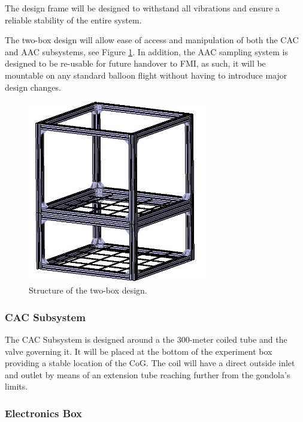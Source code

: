 The design frame will be designed to withstand all vibrations and ensure a reliable stability of the entire system. 

The two-box design will allow ease of access and manipulation of both the CAC and AAC subsystems, see Figure \ref{strucutre}. In addition, the AAC sampling system is designed to be re-usable for future handover to FMI, as such, it will be mountable on any standard balloon flight without having to introduce major design changes.

\begin{figure}[!ht]
    \centering
    \includegraphics[width=0.7\textwidth]{4-experiment-design/img/frame_structure.jpg}
    \caption{Structure of the two-box design.}
    \label{strucutre}
\end{figure}

\subsubsection{CAC Subsystem}

The CAC Subsystem is designed around a the 300-meter coiled tube and the valve governing it. It will be placed at the bottom of the experiment box providing a stable location of the CoG. The coil will have a direct outside inlet and outlet by means of an extension tube reaching further from the gondola’s limits.

\pagebreak
\subsubsection{Electronics Box}

